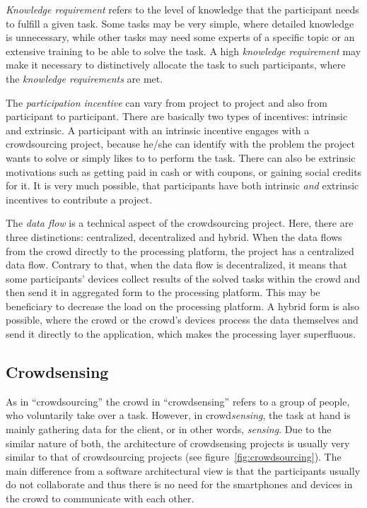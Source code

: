 \textit{Knowledge requirement} refers to the level of knowledge that the participant needs to fulfill a given task.
Some tasks may be very simple, where detailed knowledge is unnecessary, while other tasks may need some experts of a specific topic or an extensive training to be able to solve the task.
A high \textit{knowledge requirement} may make it necessary to distinctively allocate the task to such participants, where the \textit{knowledge requirements} are met.

The \textit{participation incentive} can vary from project to project and also from participant to participant.
There are basically two types of incentives: intrinsic and extrinsic.
A participant with an intrinsic incentive engages with a crowdsourcing project, because he/she can identify with the problem the project wants to solve or simply likes to to perform the task.
There can also be extrinsic motivations such as getting paid in cash or with coupons, or gaining social credits for it.
It is very much possible, that participants have both intrinsic \textit{and} extrinsic incentives to contribute a project.

The \textit{data flow} is a technical aspect of the crowdsourcing project.
Here, there are three distinctions: centralized, decentralized and hybrid.
When the data flows from the crowd directly to the processing platform, the project has a centralized data flow.
Contrary to that, when the data flow is decentralized, it means that some participants' devices collect results of the solved tasks within the crowd and then send it in aggregated form to the processing platform.
This may be beneficiary to decrease the load on the processing platform.
A hybrid form is also possible, where the crowd or the crowd's devices process the data themselves and send it directly to the application, which makes the processing layer superfluous. 

\subsection*{Crowdsensing}
As in ``crowdsourcing'' the crowd in ``crowdsensing'' refers to a group of people, who voluntarily take over a task.
However, in crowd\textit{sensing}, the task at hand is mainly gathering data for the client, or in other words, \textit{sensing}.
Due to the similar nature of both, the architecture of crowdsensing projects is usually very similar to that of crowdsourcing projects (see figure~\ref{fig:crowdsourcing}).
The main difference from a software architectural view is that the participants usually do not collaborate and thus there is no need for the smartphones and devices in the crowd to communicate with each other.

